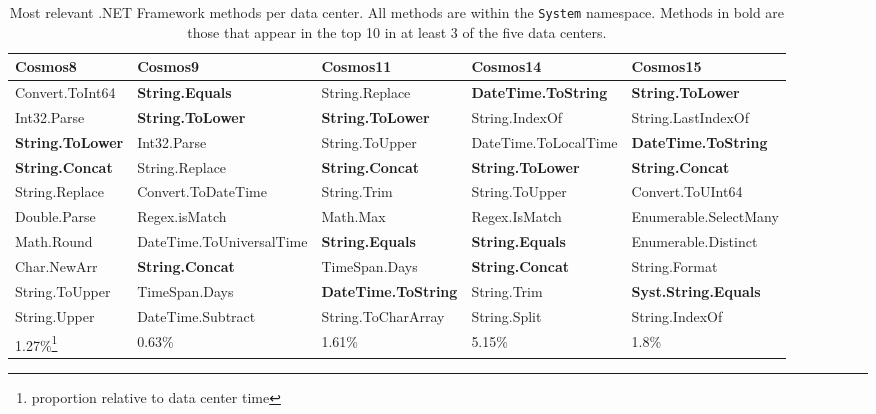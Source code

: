 \begin{table}[ht]
\small
 \begin{tabular}{@{}llllp{3.5cm}@{}}

  Cosmos8 & Cosmos9 & Cosmos11 & Cosmos14 & Cosmos15 \\
 \midrule
Convert.ToInt64 & \textbf{String.Equals} & String.Replace & \textbf{DateTime.ToString} & \textbf{String.ToLower} \\
Int32.Parse & \textbf{String.ToLower} & \textbf{String.ToLower} & String.IndexOf & String.LastIndexOf \\
\textbf{String.ToLower} & Int32.Parse & String.ToUpper & DateTime.ToLocalTime & \textbf{DateTime.ToString}\\
\textbf{String.Concat} & String.Replace & \textbf{String.Concat} & \textbf{String.ToLower} & \textbf{String.Concat}\\
String.Replace & Convert.ToDateTime & String.Trim & String.ToUpper & Convert.ToUInt64 \\
Double.Parse & Regex.isMatch & Math.Max & Regex.IsMatch & Enumerable.SelectMany \\
Math.Round& DateTime.ToUniversalTime & \textbf{String.Equals} & \textbf{String.Equals} & Enumerable.Distinct \\
Char.NewArr & \textbf{String.Concat} & TimeSpan.Days & \textbf{String.Concat} & String.Format \\
String.ToUpper & TimeSpan.Days & \textbf{DateTime.ToString} & String.Trim & \textbf{Syst.String.Equals}\\
String.Upper & DateTime.Subtract & String.ToCharArray & String.Split & String.IndexOf \\

\midrule
1.27\%\footnote{proportion relative to data center time} & 0.63\% & 1.61\% & 5.15\% & 1.8\%\\
\midrule

\end{tabular}
 
\caption{Most relevant .NET Framework methods per data center. All methods are within the {\tt System} namespace. Methods in bold are those that appear in the top 10 in at least 3 of the five data centers.
\label{tb:rankedMethods}}
\end{table}


